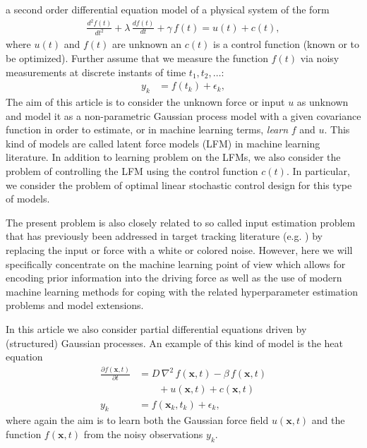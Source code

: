 \documentclass[journal]{IEEEtran}
\begin{document}
 a second order differential equation model of a physical system of the form
%
\begin{equation}
\begin{split}
  \frac{d^{2}f(t)}{dt^{2}} + \lambda \, \frac{df(t)}{dt} + \gamma \, f(t) = u(t) + c(t),
\end{split}
\label{eq:sde0}
\end{equation}
%
where $u(t)$ and $f(t)$ are unknown an $c(t)$ is a control function (known or to be optimized). Further assume that we measure the function $f(t)$ via noisy measurements at discrete instants of time $t_1,t_2,\ldots$:
%
\begin{equation}
\begin{split}
  y_k &= f(t_k) + \epsilon_k,
\end{split}
\end{equation}
%
The aim of this article is to consider the unknown force or input $u$ as unknown and model it as a non-parametric Gaussian process model \cite{Rasmussen+Williams:2006} with a given covariance function in order to estimate, or in machine learning terms, {\em learn} $f$ and $u$. This kind of models are called latent force models (LFM) \cite{Alvarez+Lawrence:2009,Alvarez:2010,Alvarez+Luengo+Lawrence:2013} in machine learning literature. In addition to learning problem on the LFMs, we also consider the problem of controlling the LFM using the control function $c(t)$. In particular, we consider the problem of optimal linear stochastic control design for this type of models.

The present problem is also closely related to so called input estimation problem that has previously been addressed in target tracking literature (e.g. \cite{Bar-Shalom+Li+Kirubarajan:2001}) by replacing the input or force with a white or colored noise. However, here we will specifically concentrate on the machine learning point of view which allows for encoding prior information into the driving force as well as the use of modern machine learning methods for coping with the related hyperparameter estimation problems and model extensions.

In this article we also consider partial differential equations driven by (structured) Gaussian processes. An example of this kind of model is the heat equation
%
\begin{equation}
\begin{split}
  \frac{\partial f(\mathbf{x},t)}{\partial t} &=
  D \, \nabla^2 \, f(\mathbf{x},t) - \beta \, f(\mathbf{x},t) \\
  &\qquad + u(\mathbf{x},t) + c(\mathbf{x},t) \\
  y_k &= f(\mathbf{x}_k,t_k) + \epsilon_k,
\end{split}
\label{eq:sde0}
\end{equation}
%
where again the aim is to learn both the Gaussian force field $u(\mathbf{x},t)$ and the function $f(\mathbf{x},t)$ from the noisy observations $y_k$. 
\end{document}
